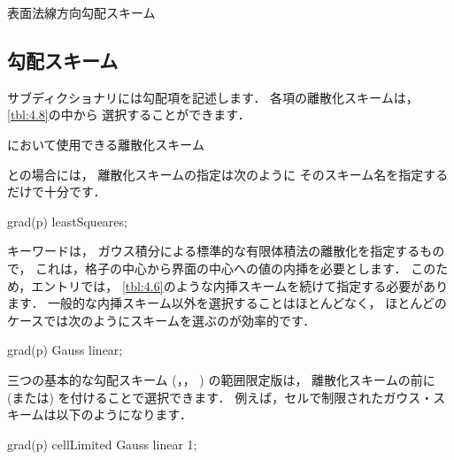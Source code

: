 \begin{table}[ht]
 
 \caption{表面法線方向勾配スキーム}
 \label{tbl:4.7}
\end{table}


\subsection{勾配スキーム}
\label{ssec:4.4.3}
サブディクショナリには勾配項を記述します．
各項の離散化スキームは，\autoref{tbl:4.8}の中から
選択することができます．


\begin{table}[ht]
 
 \caption{において使用できる離散化スキーム}
 \label{tbl:4.8}
\end{table}


との場合には，
離散化スキームの指定は次のように
そのスキーム名を指定するだけで十分です．
\begin{OFverbatim}[file]
grad(p) leastSqueares;
\end{OFverbatim}
キーワードは，
ガウス積分による標準的な有限体積法の離散化を指定するもので，
これは，格子の中心から界面の中心への値の内挿を必要とします．
このため，エントリでは，
\autoref{tbl:4.6}のような内挿スキームを続けて指定する必要があります．
一般的な内挿スキーム以外を選択することはほとんどなく，
ほとんどのケースでは次のようにスキームを選ぶのが効率的です．
\begin{OFverbatim}[file]
grad(p) Gauss linear;
\end{OFverbatim}
三つの基本的な勾配スキーム (，，
) の範囲限定版は，
離散化スキームの前に
 (または) を付けることで選択できます．
例えば，セルで制限されたガウス・スキームは以下のようになります．
\begin{OFverbatim}[file]
grad(p) cellLimited Gauss linear 1;
\end{OFverbatim}


